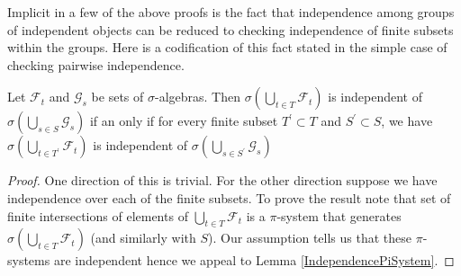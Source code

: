 Implicit in a few of the above proofs is the fact that independence
among groups of independent objects can be reduced to checking
independence of finite subsets within the groups.  Here is a
codification of this fact stated in the simple case of checking
pairwise independence.
\begin{lem}\label{IndependenceFinitary}Let $\mathcal{F}_t$ and
  $\mathcal{G}_s$ be sets of $\sigma$-algebras. Then
  $\sigma(\bigcup_{t \in T} \mathcal{F}_t)$ is independent of
  $\sigma(\bigcup_{s \in S} \mathcal{G}_s)$ if an only if for every
  finite subset $T^\prime \subset T$ and $S^\prime \subset S$, we have $\sigma(\bigcup_{t \in T^\prime} \mathcal{F}_t)$ is independent of
  $\sigma(\bigcup_{s \in S^\prime} \mathcal{G}_s)$
\end{lem}
\begin{proof}
One direction of this is trivial.  For the other direction suppose we
have independence over each of the finite subsets.  To prove the
result note that set of finite intersections of elements of
$\bigcup_{t \in T} \mathcal{F}_t$
is a $\pi$-system that generates $\sigma(\bigcup_{t \in T}
\mathcal{F}_t)$ (and similarly with $S$).  Our assumption tells us
that these $\pi$-systems are independent hence we appeal to Lemma \ref{IndependencePiSystem}.
\end{proof}

